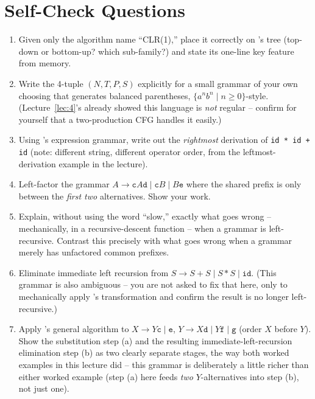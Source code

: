 \documentclass[full-course-notes.tex]{subfiles}
\begin{document}
\section{Self-Check Questions}
\label{sec:l8-selfcheck}

\begin{enrichment}
\begin{enumerate}
  \item Given only the algorithm name ``CLR(1),'' place it correctly on
  's tree (top-down or bottom-up? which sub-family?) and state its
  one-line key feature from memory.
  \item Write the 4-tuple $(N, T, P, S)$ explicitly for a small grammar of your own choosing
  that generates balanced parentheses, $\{a^n b^n \mid n \ge 0\}$-style. (Lecture~\ref{lec:4}'s
   already showed this language is \emph{not} regular --
  confirm for yourself that a two-production CFG handles it easily.)
  \item Using 's expression grammar, write out the \emph{rightmost} derivation
  of \texttt{id * id + id} (note: different string, different operator order, from the
  leftmost-derivation example in the lecture).
  \item Left-factor the grammar $A \to \texttt{c}A\texttt{d} \mid \texttt{c}B \mid B\texttt{e}$
  where the shared prefix is only between the \emph{first two} alternatives. Show your work.
  \item Explain, without using the word ``slow,'' exactly what goes wrong -- mechanically, in a
  recursive-descent function -- when a grammar is left-recursive. Contrast this precisely with
  what goes wrong when a grammar merely has unfactored common prefixes.
  \item Eliminate immediate left recursion from
  $S \to S + S \mid S * S \mid \texttt{id}$. (This grammar is also ambiguous -- you are not
  asked to fix that here, only to mechanically apply
  's transformation and confirm the result is no longer
  left-recursive.)
  \item Apply 's general algorithm to
  $X \to Y\texttt{c} \mid \texttt{e}$, $Y \to X\texttt{d} \mid Y\texttt{f} \mid \texttt{g}$
  (order $X$ before $Y$). Show the substitution step (a) and the resulting
  immediate-left-recursion elimination step (b) as two clearly separate stages, the way both
  worked examples in this lecture did -- this grammar is deliberately a little richer than
  either worked example (step (a) here feeds \emph{two} $Y$-alternatives into step (b), not
  just one).
\end{enumerate}
\end{enrichment}
\end{document}
